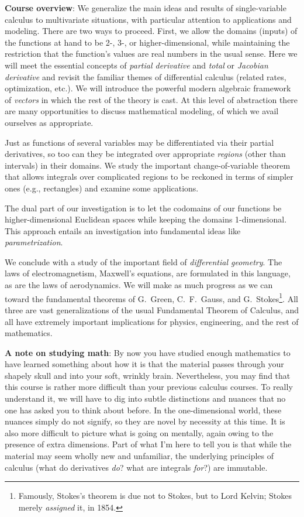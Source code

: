 \documentclass[12pt,twoside]{amsart}
\begin{document}
\textbf{Course overview}: We generalize the main ideas and results of single-variable calculus to multivariate situations, with particular attention to applications and modeling. There are two ways to proceed. First, we allow the domains (inputs) of the functions at hand to be 2-, 3-, or higher-dimensional, while maintaining the restriction that the function's values are real numbers in the usual sense. Here we will meet the essential concepts of \emph{partial derivative} and \emph{total} or \emph{Jacobian derivative} and revisit the familiar themes of differential calculus (related rates, optimization, etc.). We will introduce the powerful modern algebraic framework of \emph{vectors} in which the rest of the theory is cast. At this level of abstraction there are many opportunities to discuss mathematical modeling, of which we avail ourselves as appropriate.

Just as functions of several variables may be differentiated via their partial derivatives, so too can they be integrated over appropriate \emph{regions} (other than intervals) in their domains. We study the important change-of-variable theorem that allows integrals over complicated regions to be reckoned in terms of simpler ones (e.g., rectangles) and examine some applications. 

The dual part of our investigation is to let the codomains of our functions be higher-dimensional Euclidean spaces while keeping the domains 1-dimensional. This approach entails an investigation into fundamental ideas like \emph{parametrization}.

We conclude with a study of the important field of \emph{differential geometry}. The laws of electromagnetism, Maxwell's equations, are formulated in this language, as are the laws of aerodynamics. We will make as much progress as we can toward the fundamental theorems of G.\ Green, C.\ F.\ Gauss, and G.\ Stokes\footnote{Famously, Stokes's theorem is due not to Stokes, but to Lord Kelvin; Stokes merely \emph{assigned} it, in 1854.}. All three are vast generalizations of the usual Fundamental Theorem of Calculus, and all have extremely important implications for physics, engineering, and the rest of mathematics.

\textbf{A note on studying math}: By now you have studied enough mathematics to have learned something about how it is that the material passes through your shapely skull and into your soft, wrinkly brain. Nevertheless, you may find that this course is rather more difficult than your previous calculus courses. To really understand it, we will have to dig into subtle distinctions and nuances that no one has asked you to think about before. In the one-dimensional world, these nuances simply do not signify, so they are novel by necessity at this time. It is also more difficult to picture what is going on mentally, again owing to the presence of extra dimensions. Part of what I'm here to tell you is that while the material may seem wholly new and unfamiliar, the underlying principles of calculus (what do derivatives \emph{do}? what are integrals \emph{for}?) are immutable.
\end{document}
